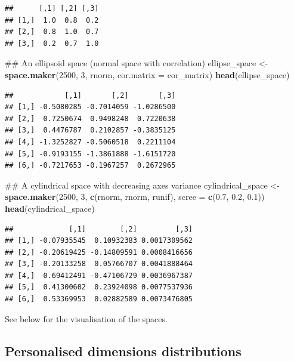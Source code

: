 \documentclass[]{book}
\newenvironment{Shaded}{\begin{snugshade}}{\end{snugshade}}
\newcommand{\KeywordTok}[1]{\textcolor[rgb]{0.13,0.29,0.53}{\textbf{#1}}}
\newcommand{\DataTypeTok}[1]{\textcolor[rgb]{0.13,0.29,0.53}{#1}}
\newcommand{\DecValTok}[1]{\textcolor[rgb]{0.00,0.00,0.81}{#1}}
\newcommand{\FloatTok}[1]{\textcolor[rgb]{0.00,0.00,0.81}{#1}}
\newcommand{\StringTok}[1]{\textcolor[rgb]{0.31,0.60,0.02}{#1}}
\newcommand{\NormalTok}[1]{#1}
\theoremstyle{definition}
\theoremstyle{definition}
\theoremstyle{definition}
\theoremstyle{remark}
\begin{document}
\begin{verbatim}
##      [,1] [,2] [,3]
## [1,]  1.0  0.8  0.2
## [2,]  0.8  1.0  0.7
## [3,]  0.2  0.7  1.0
\end{verbatim}

\begin{Shaded}
\begin{Highlighting}[]
\NormalTok{## An ellipsoid space (normal space with correlation)}
\NormalTok{ellipse_space <-}\StringTok{ }\KeywordTok{space.maker}\NormalTok{(}\DecValTok{2500}\NormalTok{, }\DecValTok{3}\NormalTok{, rnorm, }\DataTypeTok{cor.matrix =}\NormalTok{ cor_matrix)}
\KeywordTok{head}\NormalTok{(ellipse_space)}
\end{Highlighting}
\end{Shaded}

\begin{verbatim}
##            [,1]       [,2]       [,3]
## [1,] -0.5080285 -0.7014059 -1.0286500
## [2,]  0.7250674  0.9498248  0.7220638
## [3,]  0.4476787  0.2102857 -0.3835125
## [4,] -1.3252827 -0.5060518  0.2211104
## [5,] -0.9193155 -1.3861888 -1.6151720
## [6,] -0.7217653 -0.1967257  0.2672965
\end{verbatim}

\begin{Shaded}
\begin{Highlighting}[]
\NormalTok{## A cylindrical space with decreasing axes variance}
\NormalTok{cylindrical_space <-}\StringTok{ }\KeywordTok{space.maker}\NormalTok{(}\DecValTok{2500}\NormalTok{, }\DecValTok{3}\NormalTok{, }\KeywordTok{c}\NormalTok{(rnorm, rnorm, runif),}
                                 \DataTypeTok{scree =} \KeywordTok{c}\NormalTok{(}\FloatTok{0.7}\NormalTok{, }\FloatTok{0.2}\NormalTok{, }\FloatTok{0.1}\NormalTok{))}
\KeywordTok{head}\NormalTok{(cylindrical_space)}
\end{Highlighting}
\end{Shaded}

\begin{verbatim}
##             [,1]        [,2]         [,3]
## [1,] -0.07935545  0.10932383 0.0017309562
## [2,] -0.20619425 -0.14809591 0.0008416656
## [3,] -0.20133258  0.05766707 0.0041888464
## [4,]  0.69412491 -0.47106729 0.0036967387
## [5,]  0.41300602  0.23924098 0.0077537936
## [6,]  0.53369953  0.02882589 0.0073476805
\end{verbatim}

See below for the visualisation of the spaces.

\subsection{Personalised dimensions
distributions}\label{personalised-dimensions-distributions}
\end{document}
